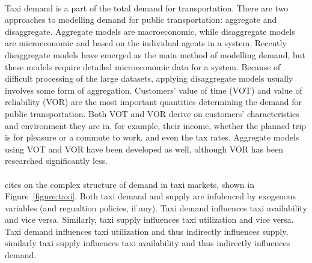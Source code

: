 \paragraph{} Taxi demand is a part of the total demand for transportation.
There are two approaches to modelling demand for public transportation:
aggregate and disaggregate. Aggregate models are macroeconomic, while
disaggregate models are microeconomic and based on the individual agents in a
system. Recently disaggregate models have emerged as the main method of
modelling demand, but these models require detailed microeconomic data for a
system. Because of difficult processing of the large datasets, applying
disaggregate models usually involves some form of aggregation. Customers' value
of time (VOT) and value of reliability (VOR) are the most important quantities
determining the demand for public transportation. Both VOT and VOR derive on
customers' characteristics and environment they are in, for example, their
income, whether the planned trip is for pleasure or a commute to work, and even
the tax rates. Aggregate models using VOT and VOR have been developed as well,
although VOR has been researched significantly less.
\parencite{Small2007taxi+urban}

\paragraph{} \textcite{Yang2002taxi+demand} cites
\textcite{Manski1967taxi+demand} on the complex structure of demand in taxi
markets, shown in Figure~\ref{figure:taxi}. Both taxi demand and supply are
infulenced by exogenous variables (and regualtion policies, if any). Taxi
demand influences taxi availability and vice versa. Similarly, taxi supply
influences taxi utilization and vice versa. Taxi demand influences taxi
utilization and thus indirectly influences supply, similarly taxi supply
influences taxi availability and thus indirectly influences demand. 

